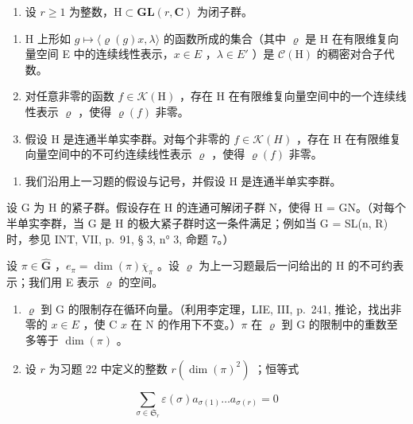 \begin{enumerate}
\def\labelenumi{\arabic{enumi})}
\setcounter{enumi}{21}
\tightlist
\item
  设 \(r \geqslant 1\) 为整数，\(\mathrm{H} \subset \mathbf{GL}(r, \mathbf{C})\) 为闭子群。
\end{enumerate}

\begin{enumerate}
\def\labelenumi{\alph{enumi})}
\item
  H 上形如 \(g \mapsto \langle \varrho(g)x, \lambda \rangle\) 的函数所成的集合（其中 \(\varrho\) 是 H 在有限维复向量空间 E 中的连续线性表示，\(x \in E\) ，\(\lambda \in E'\) ）是 \(\mathcal{C}(\mathrm{H})\) 的稠密对合子代数。
\item
  对任意非零的函数 \(f \in \mathcal{K}(\mathrm{H})\) ，存在 H 在有限维复向量空间中的一个连续线性表示 \(\varrho\) ，使得 \(\varrho(f)\) 非零。
\item
  假设 H 是连通半单实李群。对每个非零的 \(f \in \mathcal{K}(H)\) ，存在 H 在有限维复向量空间中的不可约连续线性表示 \(\varrho\) ，使得 \(\varrho(f)\) 非零。
\end{enumerate}

\begin{enumerate}
\def\labelenumi{\arabic{enumi})}
\setcounter{enumi}{22}
\tightlist
\item
  我们沿用上一习题的假设与记号，并假设 H 是连通半单实李群。
\end{enumerate}

设 G 为 H 的紧子群。假设存在 H 的连通可解闭子群 N，使得 H = GN。（对每个半单实李群，当 G 是 H 的极大紧子群时这一条件满足；例如当 G = SL(n, R) 时，参见 INT, VII, p.~91, § 3, n° 3, 命题 7。）

设 \(\pi \in \widehat{\mathbf{G}}\) ，\(e_{\pi} = \dim (\pi)\overline{\chi}_{\pi}\) 。设 \(\varrho\) 为上一习题最后一问给出的 H 的不可约表示；我们用 E 表示 \(\varrho\) 的空间。

\begin{enumerate}
\def\labelenumi{\alph{enumi})}
\item
  \(\varrho\) 到 G 的限制存在循环向量。（利用李定理，LIE, III, p.~241, 推论，找出非零的 \(x \in E\) ，使 C \(x\) 在 N 的作用下不变。）\(\pi\) 在 \(\varrho\) 到 G 的限制中的重数至多等于 \(\dim(\pi)\) 。
\item
  设 \(r\) 为习题 22 中定义的整数 \(r(\dim (\pi)^2)\) ；恒等式
\end{enumerate}

\[
\sum_ {\sigma \in \mathfrak {S} _ {r}} \varepsilon (\sigma) a _ {\sigma (1)} \dots a _ {\sigma (r)} = 0
\]

